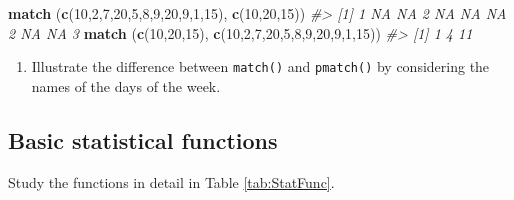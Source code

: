 \documentclass[
]{book}
\newenvironment{Shaded}{\begin{snugshade}}{\end{snugshade}}
\newcommand{\CommentTok}[1]{\textcolor[rgb]{0.56,0.35,0.01}{\textit{#1}}}
\newcommand{\DecValTok}[1]{\textcolor[rgb]{0.00,0.00,0.81}{#1}}
\newcommand{\FunctionTok}[1]{\textcolor[rgb]{0.13,0.29,0.53}{\textbf{#1}}}
\newcommand{\NormalTok}[1]{#1}
\providecommand{\tightlist}{%
  \setlength{\itemsep}{0pt}\setlength{\parskip}{0pt}}
\begin{document}
\begin{Shaded}
\begin{Highlighting}[]
\FunctionTok{match}\NormalTok{ (}\FunctionTok{c}\NormalTok{(}\DecValTok{10}\NormalTok{,}\DecValTok{2}\NormalTok{,}\DecValTok{7}\NormalTok{,}\DecValTok{20}\NormalTok{,}\DecValTok{5}\NormalTok{,}\DecValTok{8}\NormalTok{,}\DecValTok{9}\NormalTok{,}\DecValTok{20}\NormalTok{,}\DecValTok{9}\NormalTok{,}\DecValTok{1}\NormalTok{,}\DecValTok{15}\NormalTok{), }\FunctionTok{c}\NormalTok{(}\DecValTok{10}\NormalTok{,}\DecValTok{20}\NormalTok{,}\DecValTok{15}\NormalTok{))}
\CommentTok{\#\textgreater{}  [1]  1 NA NA  2 NA NA NA  2 NA NA  3}
\FunctionTok{match}\NormalTok{ (}\FunctionTok{c}\NormalTok{(}\DecValTok{10}\NormalTok{,}\DecValTok{20}\NormalTok{,}\DecValTok{15}\NormalTok{), }\FunctionTok{c}\NormalTok{(}\DecValTok{10}\NormalTok{,}\DecValTok{2}\NormalTok{,}\DecValTok{7}\NormalTok{,}\DecValTok{20}\NormalTok{,}\DecValTok{5}\NormalTok{,}\DecValTok{8}\NormalTok{,}\DecValTok{9}\NormalTok{,}\DecValTok{20}\NormalTok{,}\DecValTok{9}\NormalTok{,}\DecValTok{1}\NormalTok{,}\DecValTok{15}\NormalTok{))}
\CommentTok{\#\textgreater{} [1]  1  4 11}
\end{Highlighting}
\end{Shaded}

\begin{enumerate}
\def\labelenumi{(\alph{enumi})}
\setcounter{enumi}{5}
\tightlist
\item
  Illustrate the difference between \texttt{match()} and \texttt{pmatch()} by considering the names of the days of the week.
\end{enumerate}

\subsection{Basic statistical functions}\label{basic-statistical-functions}

Study the functions in detail in Table \ref{tab:StatFunc}.
\end{document}
